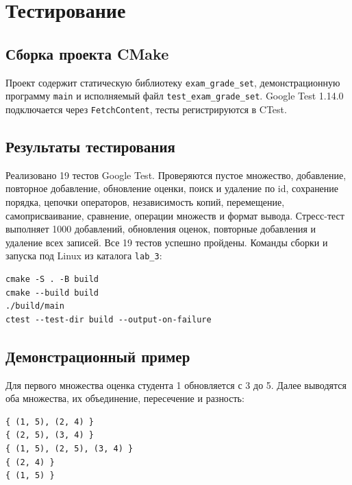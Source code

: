 \section{Тестирование}

\subsection{Сборка проекта CMake}

Проект содержит статическую библиотеку \texttt{exam\_grade\_set}, демонстрационную программу \texttt{main} и исполняемый файл \texttt{test\_exam\_grade\_set}. Google Test 1.14.0 подключается через \texttt{FetchContent}, тесты регистрируются в CTest.



\subsection{Результаты тестирования}

Реализовано 19 тестов Google Test. Проверяются пустое множество, добавление, повторное добавление, обновление оценки, поиск и удаление по id, сохранение порядка, цепочки операторов, независимость копий, перемещение, самоприсваивание, сравнение, операции множеств и формат вывода. Стресс-тест выполняет 1000 добавлений, обновления оценок, повторные добавления и удаление всех записей.
Все 19 тестов успешно пройдены.
Команды сборки и запуска под Linux из каталога \texttt{lab\_3}:
\begin{verbatim}
cmake -S . -B build
cmake --build build
./build/main
ctest --test-dir build --output-on-failure
\end{verbatim}

\subsection{Демонстрационный пример}

Для первого множества оценка студента 1 обновляется с 3 до 5. Далее выводятся оба множества, их объединение, пересечение и разность:
\begin{verbatim}
{ (1, 5), (2, 4) }
{ (2, 5), (3, 4) }
{ (1, 5), (2, 5), (3, 4) }
{ (2, 4) }
{ (1, 5) }
\end{verbatim}
